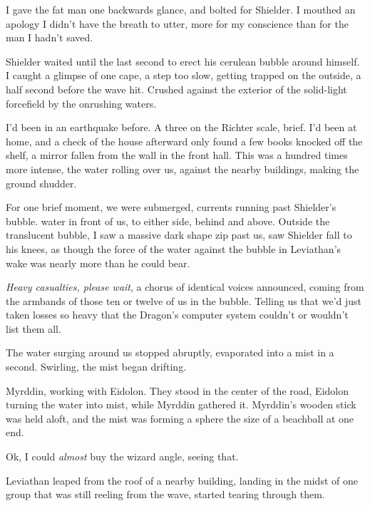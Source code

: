 I gave the fat man one backwards glance, and bolted for Shielder. I mouthed an apology I didn't have the breath to utter, more for my conscience than for the man I hadn't saved.



Shielder waited until the last second to erect his cerulean bubble around himself.  I caught a glimpse of one cape, a step too slow, getting trapped on the outside, a half second before the wave hit.  Crushed against the exterior of the solid-light forcefield by the onrushing waters.



I'd been in an earthquake before.  A three on the Richter scale, brief.  I'd been at home, and a check of the house afterward only found a few books knocked off the shelf, a mirror fallen from the wall in the front hall.  This was a hundred times more intense, the water rolling over us, against the nearby buildings, making the ground shudder.



For one brief moment, we were submerged, currents running past Shielder's bubble.  water in front of us, to either side, behind and above.  Outside the translucent bubble, I saw a massive dark shape zip past us, saw Shielder fall to his knees, as though the force of the water against the bubble in Leviathan's wake was nearly more than he could bear.



\emph{Heavy casualties, please wait}, a chorus of identical voices announced, coming from the armbands of those ten or twelve of us in the bubble.  Telling us that we'd just taken losses so heavy that the Dragon's computer system couldn't or wouldn't list them all.



The water surging around us stopped abruptly, evaporated into a mist in a second.  Swirling, the mist began drifting.



Myrddin, working with Eidolon. They stood in the center of the road, Eidolon turning the water into mist, while Myrddin gathered it.  Myrddin's wooden stick was held aloft, and the mist was forming a sphere the size of a beachball at one end.



Ok, I could \emph{almost} buy the wizard angle, seeing that.



Leviathan leaped from the roof of a nearby building, landing in the midst of one group that was still reeling from the wave, started tearing through them.



